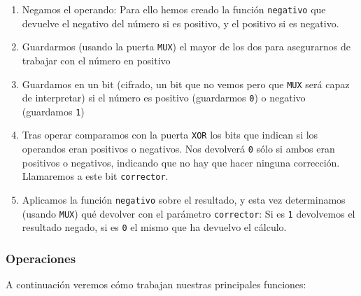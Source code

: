 \begin{enumerate}
  \begin{enumerate}
    \item Negamos el operando: Para ello hemos creado la función \texttt{negativo} que devuelve el negativo del número si es positivo, y el positivo si es negativo.
    \item Guardarmos (usando la puerta \texttt{MUX}) el mayor de los dos para asegurarnos de trabajar con el número en positivo
    \item Guardamos en un bit (cifrado, un bit que no vemos pero que \texttt{MUX} será capaz de interpretar) si el número es positivo (guardarmos \texttt{0}) o negativo (guardamos \texttt{1})
    \item Tras operar comparamos con la puerta \texttt{XOR} los bits que indican si los operandos eran positivos o negativos. Nos devolverá \texttt{0} sólo si ambos eran positivos o negativos, indicando que no hay que hacer ninguna corrección. Llamaremos a este bit \texttt{corrector}.
    \item Aplicamos la función \texttt{negativo} sobre el resultado, y esta vez determinamos (usando \texttt{MUX}) qué devolver con el parámetro \texttt{corrector}: Si es \texttt{1} devolvemos el resultado negado, si es \texttt{0} el mismo que ha devuelvo el cálculo.
  \end{enumerate}

\end{enumerate}

\subsubsection{Operaciones}

A continuación veremos cómo trabajan nuestras principales funciones:

